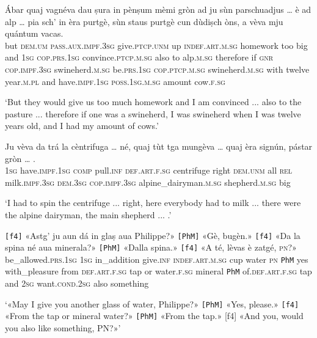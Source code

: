 \begin{linenumbers}
	\gll  Ábar quaj vagnéva dau ṣura in pènṣum mèmi gròn ad ju sùn parschuadjus … è ad alp … pia sch’ in èra purtgè, sùn staus purtgè cun dùdiṣch òns, a vèva mju quántum vacas.  \\
	but \textsc{dem.um} \textsc{pass.aux.impf.3sg} give.\textsc{ptcp.unm} up \textsc{indef.art.m.sg} homework too big and \textsc{1sg} \textsc{cop.prs.1sg} convince.\textsc{ptcp.m.sg} {} also to alp.\textsc{m.sg} {} therefore if \textsc{gnr} \textsc{cop.impf.3sg} swineherd.\textsc{m.sg} be.\textsc{prs.1sg} \textsc{cop.ptcp.m.sg} swineherd\textsc{.m.sg} with twelve year.\textsc{m.pl} and have.\textsc{impf.1sg} \textsc{poss.1sg.m.sg} amount cow.\textsc{f.sg}\\
\end{linenumbers}
\medskip
\glt `But they would give us too much homework and I am convinced ... also to the pasture ... therefore if one was a swineherd, I was swineherd when I was twelve years old, and I had my amount of cows.'
\medskip

\begin{linenumbers}
	\gll Ju vèva da trá la cèntrifuga … né, quaj tùt tga mungèva … quaj èra signún, pástar gròn … .  \\
\textsc{1sg} have.\textsc{impf.1sg} \textsc{comp} pull.\textsc{inf} \textsc{def.art.f.sg} centrifuge {} right \textsc{dem.unm} all \textsc{rel} milk.\textsc{impf.3sg} {} \textsc{dem.3sg} \textsc{cop.impf.3sg} alpine\_dairyman.\textsc{m.sg} shepherd.\textsc{m.sg} big\\
\end{linenumbers}
\medskip
\glt `I had to spin the centrifuge ... right, here everybody had to milk ... there were the alpine dairyman, the main shepherd ... .'
\medskip

\begin{linenumbers}
	\gll  \texttt{[f4]} «Astg’ ju aun dá in glaṣ aua Philippe?» \texttt{[PhM]} «Gè, bugèn.» \texttt{[f4]} «Da la spina né aua minerala?» \texttt{[PhM]} «Dalla spina.» \texttt{[f4]} «A té, lèvas è zatgé, \textsc{pn}?»  \\
	{} be\_allowed.\textsc{prs.1sg} \textsc{1sg} in\_addition give.\textsc{inf} \textsc{indef.art.m.sg} cup water \textsc{pn} \texttt{PhM} yes with\_pleasure {} from \textsc{def.art.f.sg} tap or water.\textsc{f.sg} mineral \texttt{PhM} of.\textsc{def.art.f.sg} tap {} and \textsc{2sg} want.\textsc{cond.2sg} also something\\
\end{linenumbers}
\medskip
\glt `«May I give you another glass of water, Philippe?» \texttt{[PhM]} «Yes, please.» \texttt{[f4]} «From the tap or mineral water?» \texttt{[PhM]} «From the tap.» [f4] «And you, would you also like something, PN?»'
\medskip

